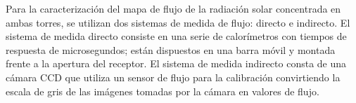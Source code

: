 Para la caracterización del mapa de flujo de la radiación solar concentrada en ambas torres, se utilizan dos sistemas de medida de flujo: directo e indirecto. El sistema de medida directo consiste en una serie de calorímetros con tiempos de respuesta de microsegundos; están dispuestos en una barra móvil y montada frente a la apertura del receptor. El sistema de medida indirecto consta de una cámara CCD que utiliza un sensor de flujo para la calibración convirtiendo la escala de gris de las imágenes tomadas por la cámara en valores de flujo. \cite{PSA4WebSite}
